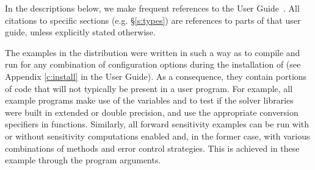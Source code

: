 In the descriptions below, we make frequent references to the {\cvodes}
User Guide~\cite{cvodes_ug}.  All citations to specific sections
(e.g. \S\ref{s:types}) are references to parts of that user guide, unless
explicitly stated otherwise.

\vspace{0.2in}
The examples in the {\cvodes} distribution were written in such a way as
to compile and run for any combination of configuration options during
the installation of {\sundials} (see Appendix \ref{c:install} in the User Guide).
As a consequence, they contain portions of code that will not typically be present in a
user program. For example, all example programs make use of the
variables  and 
to test if the solver libraries
were built in extended or double precision, and use the appropriate conversion 
specifiers in  functions. Similarly, all forward sensitivity
examples can be run with or without sensitivity computations enabled and,
in the former case, with various combinations of methods and error control 
strategies. This is achieved in these example through the program arguments.

